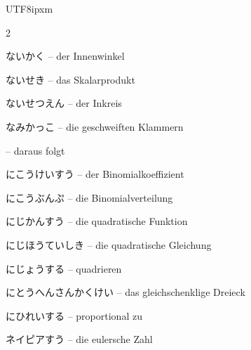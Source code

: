 \begin{CJK}{UTF8}{ipxm}
\begin{multicols}{2}
\par\nopagebreak
{} {\footnotesize\color{black!70}ないかく} -- der Innenwinkel\dotfill\hyperref[e:178]{\pageref*{e:178}}\par
{} {\footnotesize\color{black!70}ないせき} -- das Skalarprodukt\dotfill\hyperref[e:306]{\pageref*{e:306}}\par
{} {\footnotesize\color{black!70}ないせつえん} -- der Inkreis\dotfill\hyperref[e:193]{\pageref*{e:193}}\par
{} {\footnotesize\color{black!70}なみかっこ} -- die geschweiften Klammern\dotfill\hyperref[e:90]{\pageref*{e:90}}\par
{} -- daraus folgt\dotfill\hyperref[e:350]{\pageref*{e:350}}\par
{} {\footnotesize\color{black!70}にこうけいすう} -- der Binomialkoeffizient\dotfill\hyperref[e:344]{\pageref*{e:344}}\par
{} {\footnotesize\color{black!70}にこうぶんぷ} -- die Binomialverteilung\dotfill\hyperref[e:345]{\pageref*{e:345}}\par
{} {\footnotesize\color{black!70}にじかんすう} -- die quadratische Funktion\dotfill\hyperref[e:124]{\pageref*{e:124}}\par
{} {\footnotesize\color{black!70}にじほうていしき} -- die quadratische Gleichung\dotfill\hyperref[e:82]{\pageref*{e:82}}\par
{} {\footnotesize\color{black!70}にじょうする} -- quadrieren\dotfill\hyperref[e:51]{\pageref*{e:51}}\par
{} {\footnotesize\color{black!70}にとうへんさんかくけい} -- das gleichschenklige Dreieck\dotfill\hyperref[e:182]{\pageref*{e:182}}\par
{} {\footnotesize\color{black!70}にひれいする} -- proportional zu\dotfill\hyperref[e:68]{\pageref*{e:68}}\par
{} {\footnotesize\color{black!70}ネイピアすう} -- die eulersche Zahl\dotfill\hyperref[e:298]{\pageref*{e:298}}\par


\end{multicols}
\end{CJK}
